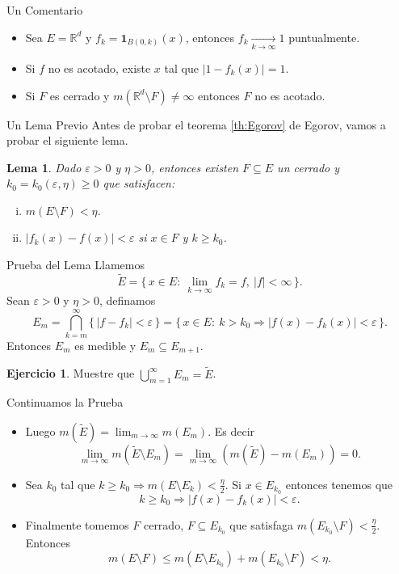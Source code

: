 \documentclass[utf8]{beamer}
\theoremstyle{plain}
\newtheorem{Lem}{Lema}                 %
\theoremstyle{definition}
\newtheorem{Ej}{Ejercicio}             %
\theoremstyle{remark}
\numberwithin{equation}{section}
\newcommand{\eps}{\varepsilon}          %
\newcommand{\bR}{\mathbb{R}}    %
\newcommand{\set}[1]{\{\,#1\,\}}    %
\renewcommand{\geq}{\geqslant}          %
\renewcommand{\leq}{\leqslant}          %
\newcommand{\less}{\setminus}           %
\newcommand{\To}{\Rightarrow}
\newcommand{\ind}{\mathbf{1}}       %
\newcommand{\sucm}{_{m=1}^\infty} %
\renewcommand{\.}{\Cdot}                %
\begin{document}
\begin{frame}{Un Comentario}
  \begin{itemize}
    \item Sea $E=\bR^d$ y $f_k=\ind_{B(0,k)}(x)$, entonces $f_k\xrightarrow[k\to\infty]{}1$ puntualmente.
    \item Si $f$ no es acotado, existe $x$ tal que $|1-f_k(x)|=1$.
    \item Si $F$ es cerrado y $m(\bR^d\less F)\neq\infty$ entonces $F$ no es acotado.
  \end{itemize}
\end{frame}

\begin{frame}{Un Lema Previo}
  Antes de probar el teorema \ref{th:Egorov} de Egorov, vamos a probar el siguiente lema.
  \begin{Lem}\label{lem:tecEgorov}
Dado $\eps>0$ y $\eta>0$, entonces existen $F\subseteq E$ un cerrado y $k_0=k_0(\eps,\eta)\geq 0$ que satisfacen:
\begin{enumerate}[(i)]
  \item $m(E\less F)<\eta$.
  \item $|f_k(x)-f(x)|<\eps$ si $x\in F$ y $k\geq k_0$.
\end{enumerate} 
  \end{Lem}
\end{frame}

\begin{frame}{Prueba del Lema}
  Llamemos 
  $$\tilde E=\set{x\in E:\ \lim_{k\to\infty}f_k=f,\ |f|<\infty}.$$
  Sean $\eps>0$ y $\eta>0$, definamos
  $$E_m=\bigcap_{k=m}^\infty\set{|f-f_k|<\eps}=\set{x\in E:\ k>k_0\To |f(x)-f_k(x)|<\eps}.$$
  Entonces $E_m$ es medible y $E_m\subseteq E_{m+1}$. 
  \begin{Ej}\label{ej:pruebaLemEgorov}
Muestre que $\bigcup\sucm E_m=\tilde{E}$.
  \end{Ej}
\end{frame}

\begin{frame}{Continuamos la Prueba}
 \begin{itemize}
   \item Luego $m(\tilde{E})=\lim_{m\to\infty}m(E_m)$. Es decir
   $$\lim_{m\to\infty}m(\tilde{E}\less E_m)=\lim_{m\to\infty}(m(\tilde{E})-m(E_m))=0.$$
  \item Sea $k_0$ tal que $k\geq k_0\To m(E\less E_k)<\frac{\eta}{2}$. Si $x\in E_{k_0}$ entonces tenemos que 
  $$k\geq k_0\To |f(x)-f_k(x)|<\eps.$$
  \item Finalmente tomemos $F$ cerrado, $F\subseteq E_{k_0}$ que satisfaga $m(E_{k_0}\less F)<\frac{\eta}{2}$. Entonces
  $$m(E\less F)\leq m(E\less E_{k_0})+m(E_{k_0}\less F)<\eta.$$
 \end{itemize}
\end{frame}
\end{document}
